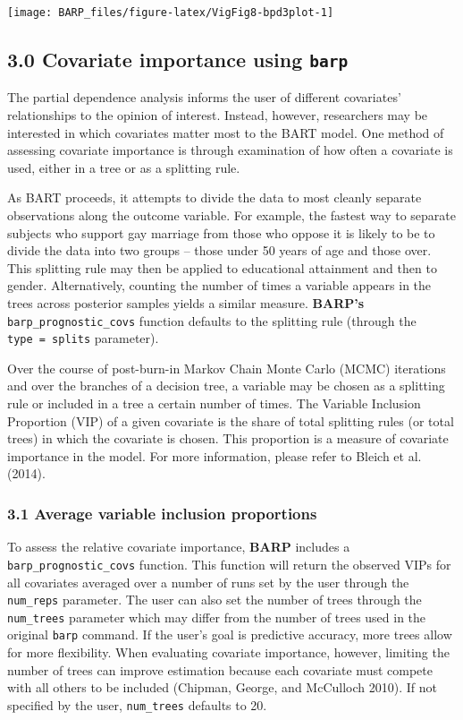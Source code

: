 \documentclass[]{article}
\begin{document}
\begin{center}\texttt{[image: BARP\_files/figure-latex/VigFig8-bpd3plot-1]} \end{center}

\subsection{\texorpdfstring{3.0 Covariate importance using
\texttt{barp}}{3.0 Covariate importance using barp}}\label{covariate-importance-using-barp}

The partial dependence analysis informs the user of different
covariates' relationships to the opinion of interest. Instead, however,
researchers may be interested in which covariates matter most to the
BART model. One method of assessing covariate importance is through
examination of how often a covariate is used, either in a tree or as a
splitting rule.

As BART proceeds, it attempts to divide the data to most cleanly
separate observations along the outcome variable. For example, the
fastest way to separate subjects who support gay marriage from those who
oppose it is likely to be to divide the data into two groups -- those
under 50 years of age and those over. This splitting rule may then be
applied to educational attainment and then to gender. Alternatively,
counting the number of times a variable appears in the trees across
posterior samples yields a similar measure. \textbf{BARP's}
\texttt{barp\_prognostic\_covs} function defaults to the splitting rule
(through the
\texttt{type\ =\ \textquotesingle{}splits\textquotesingle{}} parameter).

Over the course of post-burn-in Markov Chain Monte Carlo (MCMC)
iterations and over the branches of a decision tree, a variable may be
chosen as a splitting rule or included in a tree a certain number of
times. The Variable Inclusion Proportion (VIP) of a given covariate is
the share of total splitting rules (or total trees) in which the
covariate is chosen. This proportion is a measure of covariate
importance in the model. For more information, please refer to Bleich et
al. (2014).

\subsubsection{3.1 Average variable inclusion
proportions}\label{average-variable-inclusion-proportions}

To assess the relative covariate importance, \textbf{BARP} includes a
\texttt{barp\_prognostic\_covs} function. This function will return the
observed VIPs for all covariates averaged over a number of runs set by
the user through the \texttt{num\_reps} parameter. The user can also set
the number of trees through the \texttt{num\_trees} parameter which may
differ from the number of trees used in the original \texttt{barp}
command. If the user's goal is predictive accuracy, more trees allow for
more flexibility. When evaluating covariate importance, however,
limiting the number of trees can improve estimation because each
covariate must compete with all others to be included (Chipman, George,
and McCulloch 2010). If not specified by the user, \texttt{num\_trees}
defaults to 20.
\end{document}
